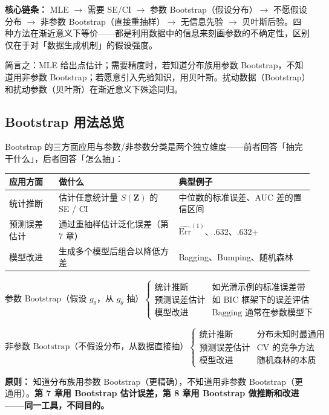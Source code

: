 \textbf{核心链条：} MLE $\to$ 需要 SE/CI $\to$ 参数 Bootstrap（假设分布）$\to$ 不愿假设分布 $\to$ 非参数 Bootstrap（直接重抽样）$\to$ 无信息先验 $\to$ 贝叶斯后验。四种方法在渐近意义下等价——都是利用数据中的信息来刻画参数的不确定性，区别仅在于对「数据生成机制」的假设强度。

简言之：MLE 给出点估计；需要精度时，若知道分布族用参数 Bootstrap，不知道用非参数 Bootstrap；若愿意引入先验知识，用贝叶斯。扰动数据（Bootstrap）和扰动参数（贝叶斯）在渐近意义下殊途同归。

\subsection{Bootstrap 用法总览}

Bootstrap 的三方面应用与参数/非参数分类是两个独立维度——前者回答「抽完干什么」，后者回答「怎么抽」：

\begin{center}
\begin{tabular}{p{2.5cm}p{4cm}p{4.5cm}}
\toprule
\textbf{应用方面} & \textbf{做什么} & \textbf{典型例子} \\
\midrule
统计推断 & 估计任意统计量 $S(\mathbf{Z})$ 的 SE / CI & 中位数的标准误差、AUC 差的置信区间 \\
预测误差估计 & 通过重抽样估计泛化误差（第 7 章） & $\widehat{\mathrm{Err}}^{(1)}$、.632、.632+ \\
模型改进 & 生成多个模型后组合以降低方差 & Bagging、Bumping、随机森林 \\
\bottomrule
\end{tabular}
\end{center}

\[
\text{参数 Bootstrap（假设 } g_\theta \text{，从 } g_{\hat{\theta}} \text{ 抽）}
\begin{cases}
\text{统计推断} & \text{如光滑示例的标准误差带} \\
\text{预测误差估计} & \text{如 BIC 框架下的误差评估} \\
\text{模型改进} & \text{Bagging 通常在参数模型下}
\end{cases}
\]

\[
\text{非参数 Bootstrap（不假设分布，从数据直接抽）}
\begin{cases}
\text{统计推断} & \text{分布未知时最通用} \\
\text{预测误差估计} & \text{CV 的竞争方法} \\
\text{模型改进} & \text{随机森林的本质}
\end{cases}
\]

\textbf{原则：} 知道分布族用参数 Bootstrap（更精确），不知道用非参数 Bootstrap（更通用）。\textbf{第 7 章用 Bootstrap 估计误差，第 8 章用 Bootstrap 做推断和改进——同一工具，不同目的。}

